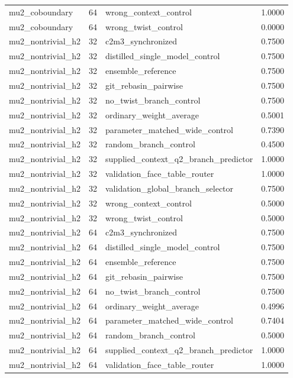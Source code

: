 \begin{tabular}{llll}
mu2\_coboundary & 64 & wrong\_context\_control & 1.0000\\
mu2\_coboundary & 64 & wrong\_twist\_control & 0.0000\\
mu2\_nontrivial\_h2 & 32 & c2m3\_synchronized & 0.7500\\
mu2\_nontrivial\_h2 & 32 & distilled\_single\_model\_control & 0.7500\\
mu2\_nontrivial\_h2 & 32 & ensemble\_reference & 0.7500\\
mu2\_nontrivial\_h2 & 32 & git\_rebasin\_pairwise & 0.7500\\
mu2\_nontrivial\_h2 & 32 & no\_twist\_branch\_control & 0.7500\\
mu2\_nontrivial\_h2 & 32 & ordinary\_weight\_average & 0.5001\\
mu2\_nontrivial\_h2 & 32 & parameter\_matched\_wide\_control & 0.7390\\
mu2\_nontrivial\_h2 & 32 & random\_branch\_control & 0.4500\\
mu2\_nontrivial\_h2 & 32 & supplied\_context\_q2\_branch\_predictor & 1.0000\\
mu2\_nontrivial\_h2 & 32 & validation\_face\_table\_router & 1.0000\\
mu2\_nontrivial\_h2 & 32 & validation\_global\_branch\_selector & 0.7500\\
mu2\_nontrivial\_h2 & 32 & wrong\_context\_control & 0.5000\\
mu2\_nontrivial\_h2 & 32 & wrong\_twist\_control & 0.5000\\
mu2\_nontrivial\_h2 & 64 & c2m3\_synchronized & 0.7500\\
mu2\_nontrivial\_h2 & 64 & distilled\_single\_model\_control & 0.7500\\
mu2\_nontrivial\_h2 & 64 & ensemble\_reference & 0.7500\\
mu2\_nontrivial\_h2 & 64 & git\_rebasin\_pairwise & 0.7500\\
mu2\_nontrivial\_h2 & 64 & no\_twist\_branch\_control & 0.7500\\
mu2\_nontrivial\_h2 & 64 & ordinary\_weight\_average & 0.4996\\
mu2\_nontrivial\_h2 & 64 & parameter\_matched\_wide\_control & 0.7404\\
mu2\_nontrivial\_h2 & 64 & random\_branch\_control & 0.5000\\
mu2\_nontrivial\_h2 & 64 & supplied\_context\_q2\_branch\_predictor & 1.0000\\
mu2\_nontrivial\_h2 & 64 & validation\_face\_table\_router & 1.0000\\

\end{tabular}
